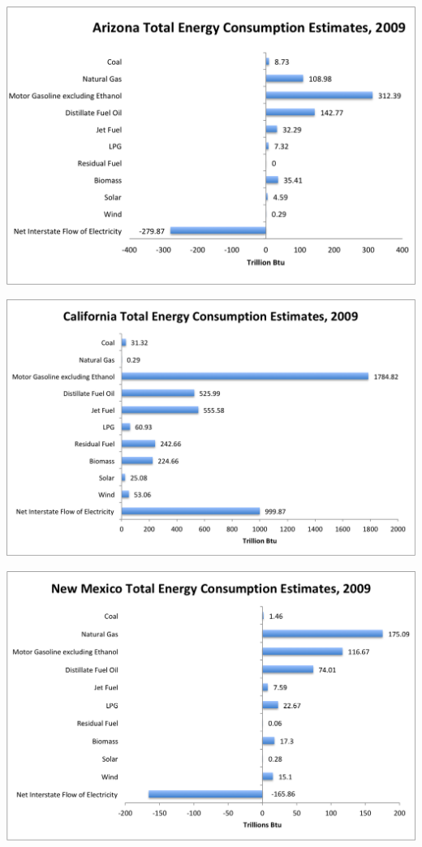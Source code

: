 \documentclass[9pt,twocolumn,twoside]{pnas-new}
\begin{document}
\begin{center}
\includegraphics[width=15cm]{ArizonaQuickGraph.png}
\end{center}
\begin{center}
\includegraphics[width=15cm]{CaliforniaQuickGraph.png}
\end{center}
\begin{center}
\includegraphics[width=15cm]{NewMexicoQuickGraph.png}
\end{center}
\end{document}
